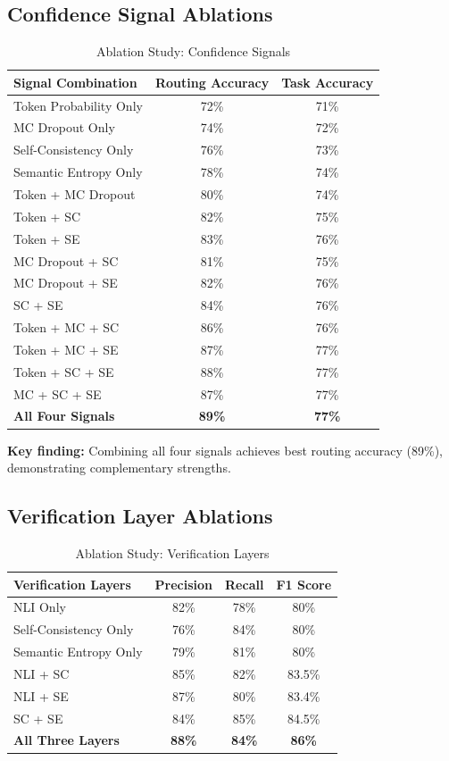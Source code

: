 \documentclass[12pt,a4paper]{article}
\theoremstyle{definition}
\begin{document}
\subsection{Confidence Signal Ablations}

\begin{table}[htbp]
\centering
\caption{Ablation Study: Confidence Signals}
\begin{tabular}{lcc}
\toprule
\textbf{Signal Combination} & \textbf{Routing Accuracy} & \textbf{Task Accuracy} \\
\midrule
Token Probability Only & 72\% & 71\% \\
MC Dropout Only & 74\% & 72\% \\
Self-Consistency Only & 76\% & 73\% \\
Semantic Entropy Only & 78\% & 74\% \\
\midrule
Token + MC Dropout & 80\% & 74\% \\
Token + SC & 82\% & 75\% \\
Token + SE & 83\% & 76\% \\
MC Dropout + SC & 81\% & 75\% \\
MC Dropout + SE & 82\% & 76\% \\
SC + SE & 84\% & 76\% \\
\midrule
Token + MC + SC & 86\% & 76\% \\
Token + MC + SE & 87\% & 77\% \\
Token + SC + SE & 88\% & 77\% \\
MC + SC + SE & 87\% & 77\% \\
\midrule
\textbf{All Four Signals} & \textbf{89\%} & \textbf{77\%} \\
\bottomrule
\end{tabular}
\end{table}

\textbf{Key finding:} Combining all four signals achieves best routing accuracy (89\%), demonstrating complementary strengths.

\subsection{Verification Layer Ablations}

\begin{table}[htbp]
\centering
\caption{Ablation Study: Verification Layers}
\begin{tabular}{lccc}
\toprule
\textbf{Verification Layers} & \textbf{Precision} & \textbf{Recall} & \textbf{F1 Score} \\
\midrule
NLI Only & 82\% & 78\% & 80\% \\
Self-Consistency Only & 76\% & 84\% & 80\% \\
Semantic Entropy Only & 79\% & 81\% & 80\% \\
\midrule
NLI + SC & 85\% & 82\% & 83.5\% \\
NLI + SE & 87\% & 80\% & 83.4\% \\
SC + SE & 84\% & 85\% & 84.5\% \\
\midrule
\textbf{All Three Layers} & \textbf{88\%} & \textbf{84\%} & \textbf{86\%} \\
\bottomrule
\end{tabular}
\end{table}
\end{document}

